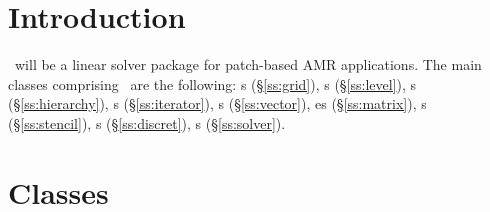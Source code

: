 \documentclass[11pt]{article}
\begin{document}
% 

\section{Introduction}

\amrSolve\ will be a linear solver package for patch-based AMR applications.
The main classes comprising \amrSolve\ are the following:
%
s (\S\ref{ss:grid}), 
s (\S\ref{ss:level}), 
s (\S\ref{ss:hierarchy}), 
s (\S\ref{ss:iterator}), 
s (\S\ref{ss:vector}), 
es (\S\ref{ss:matrix}),
s (\S\ref{ss:stencil}),
s (\S\ref{ss:discret}),
s (\S\ref{ss:solver}).


\section{Classes}
\end{document}
